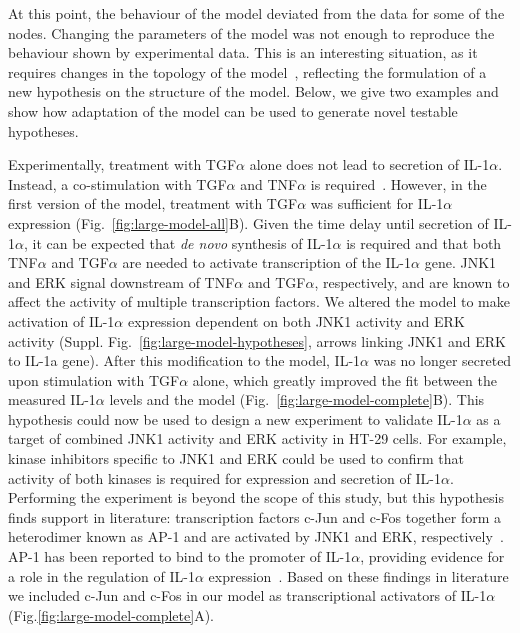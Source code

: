 \documentclass{bmcart}
\begin{document}
At this point, the behaviour of the model deviated from the data for some of the nodes.
Changing the parameters of the model was not enough to reproduce the behaviour shown by experimental
data. This is an interesting situation, as it requires changes in the topology of
the model~\cite{animo-syncop}, reflecting the formulation of a new hypothesis
on the structure of the model. Below, we give two examples and show how
adaptation of the model can be used to generate novel testable hypotheses.





Experimentally,
treatment with TGF$\alpha$ alone does not lead to secretion of IL-1$\alpha$. Instead, a co-stimulation with
TGF$\alpha$ and TNF$\alpha$ is required~\cite{pathway-autocrine}.
However, in the first version of the model, treatment with TGF$\alpha$ was sufficient for
IL-1$\alpha$ expression (Fig.~\ref{fig:large-model-all}B). Given the time delay until secretion of IL-1$\alpha$, it can be
expected that \emph{de novo} synthesis of IL-1$\alpha$ is required and that both
TNF$\alpha$ and TGF$\alpha$ are needed to activate transcription of the IL-1$\alpha$ gene.
JNK1 and ERK signal downstream of TNF$\alpha$ and TGF$\alpha$, respectively, and are known
to affect the activity of multiple transcription factors. We altered the model to make
activation of IL-1$\alpha$ expression dependent on both JNK1 activity and ERK activity
(Suppl. Fig.~\ref{fig:large-model-hypotheses}, arrows linking {\sf JNK1} and {\sf ERK} to {\sf IL-1a gene}).
After this modification to the model, IL-1$\alpha$ was no longer secreted
upon stimulation with TGF$\alpha$ alone, which greatly improved the fit between the measured IL-1$\alpha$
levels and the model (Fig.~\ref{fig:large-model-complete}B). This hypothesis could now be used to
design a new experiment to validate IL-1$\alpha$ as a target of combined JNK1 activity and ERK activity in
HT-29 cells. For example, kinase inhibitors specific to JNK1 and ERK could be used to confirm that activity of
both kinases is required for expression and secretion of IL-1$\alpha$. Performing the experiment is beyond
the scope of this study, but this hypothesis finds support in literature:
transcription factors c-Jun and c-Fos together
form a heterodimer known as AP-1 and are activated by JNK1 and ERK,
respectively~\cite{jnk-signaling,cfos-cjun}. AP-1 has been reported to bind to the
promoter of IL-1$\alpha$, providing evidence for a role in the regulation of IL-1$\alpha$
expression~\cite{ap1-il1a}. Based on these findings in literature we included c-Jun and
c-Fos in our model as transcriptional activators of IL-1$\alpha$ (Fig.\ref{fig:large-model-complete}A).
\end{document}
